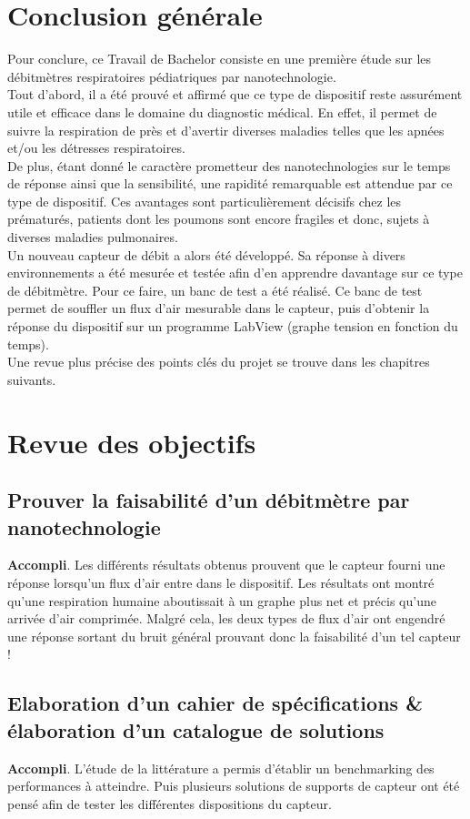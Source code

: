 \section{Conclusion générale}
Pour conclure, ce Travail de Bachelor consiste en une première étude sur les débitmètres respiratoires pédiatriques par nanotechnologie. \\
Tout d'abord, il a été prouvé et affirmé que ce type de dispositif reste assurément utile et efficace dans le domaine du diagnostic médical. 
En effet, il permet de suivre la respiration de près et d'avertir diverses maladies telles que les apnées et/ou les détresses respiratoires. \\
De plus, étant donné le caractère prometteur des nanotechnologies sur le temps de réponse ainsi que la sensibilité, une rapidité remarquable 
est attendue par ce type de dispositif. Ces avantages sont particulièrement décisifs chez les prématurés, patients dont les poumons sont encore 
fragiles et donc, sujets à diverses maladies pulmonaires.\\
Un nouveau capteur de débit a alors été développé. Sa réponse à divers environnements a été mesurée et testée afin d'en apprendre davantage sur 
ce type de débitmètre. Pour ce faire, un banc de test a été réalisé. Ce banc de test permet de souffler un flux d'air mesurable dans 
le capteur, puis d'obtenir la réponse du dispositif sur un programme LabView (graphe tension en fonction du temps). \\
Une revue plus précise des points clés du projet se trouve dans les chapitres suivants. 

\section{Revue des objectifs}
\subsection{Prouver la faisabilité d'un débitmètre par nanotechnologie}
\textbf{Accompli}. Les différents résultats obtenus prouvent que le capteur fourni une réponse lorsqu'un flux d'air entre dans le dispositif. Les 
résultats ont montré qu'une respiration humaine aboutissait à un graphe plus net et précis qu'une arrivée d'air comprimée. Malgré cela, 
les deux types de flux d'air ont engendré une réponse sortant du bruit général prouvant donc la faisabilité d'un tel capteur !

\subsection{Elaboration d'un cahier de spécifications \& élaboration d'un catalogue de solutions}
\textbf{Accompli}. L'étude de la littérature a permis d'établir un benchmarking des performances à atteindre. Puis plusieurs solutions de supports de capteur 
ont été pensé afin de tester les différentes dispositions du capteur. 

